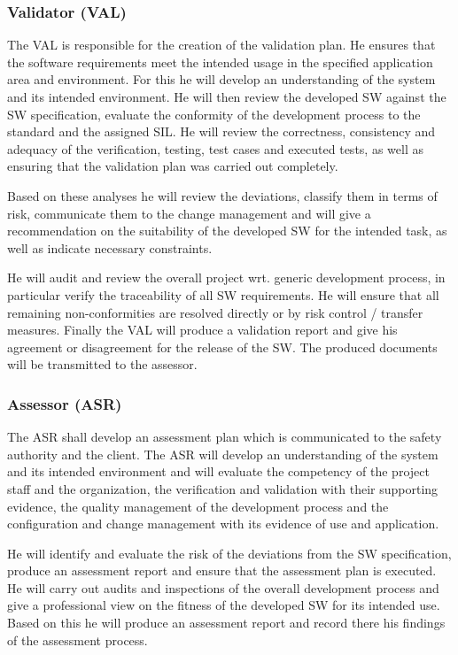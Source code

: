 \subsubsection{Validator (VAL)}
\label{sec:validator}

The VAL is responsible for the creation of the validation plan. He ensures that
the software requirements meet the intended usage in the specified application
area and environment. For this he will develop an understanding of the system
and its intended environment. He will then review the developed SW against the
SW specification, evaluate the conformity of the development process to the
standard and the assigned SIL. He will review the correctness, consistency and
adequacy of the verification, testing, test cases and executed tests, as well as
ensuring that the validation plan was carried out completely.

Based on these analyses he will review the deviations, classify them in terms
of risk, communicate them to the change management and will give a
recommendation on the suitability of the developed SW for the intended task, as
well as indicate necessary constraints.

He will audit and review the overall project wrt. generic development process,
in particular verify the traceability of all SW requirements. He will ensure
that all remaining non-conformities are resolved directly or by risk control /
transfer measures. Finally the VAL will produce a validation report and give his
agreement or disagreement for the release of the SW. The produced documents will
be transmitted to the assessor.

\subsubsection{Assessor (ASR)}
\label{sec:assessor}

The ASR shall develop an assessment plan which is communicated to the safety
authority and the client. The ASR will develop an understanding of the system
and its intended environment and will evaluate the competency of the project
staff and the organization, the verification and validation with their
supporting evidence, the quality management of the development process and the
configuration and change management with its evidence of use and application.

He will identify and evaluate the risk of the deviations from the SW
specification, produce an assessment report and ensure that the assessment plan
is executed. He will carry out audits and inspections of the overall development
process and give a professional view on the fitness of the developed SW for its
intended use. Based on this he will produce an assessment report and record
there his findings of the assessment process.

